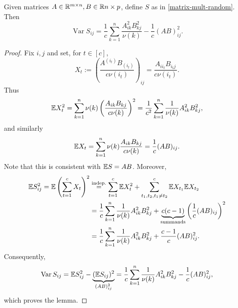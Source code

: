 \begin{lemma} \label{lemma:var-appro-prod}
Given matrices $A\in \mathbb{R}^{m \times n}, B\in \mathbb{R}{n\times p}$, define $S$ as in \eqref{matrix-mult-random}. Then
\begin{equation}
\operatorname{Var} S_{ij} = \frac{1}{c} \sum_{k=1}^n \frac{A_{ik}^2 B_{kj}^2}{\nu(k)} - \frac{1}{c} (AB)_{ij}^2.
\end{equation}
\begin{proof}
Fix $i,j$ and set, for $t\in [c]$,
\begin{equation*}
X_t := \left(
\frac{A^{(i_t)}B_{(i_t)}}{c\nu(i_t)}
\right)_{ij} = \frac{A_{i i_t}B_{i_t j}}{c\nu(i_t)}.
\end{equation*}
Thus
\begin{equation*}
\mathbb{E} X_t^2 = \sum_{k=1}^n \nu(k) \left(
\frac{A_{ik}B_{kj}}{c\nu(k)}
\right)^2 = \frac{1}{c^2}\sum_{k=1}^n \frac{1}{\nu(k)}A^2_{ik}B^2_{kj},
\end{equation*}
and similarly
\begin{equation*}
\mathbb{E} X_t = \sum_{k=1}^n \nu(k) \frac{A_{ik}B_{kj}}{c \nu(k)}= \frac{1}{c} (AB)_{ij}.
\end{equation*}
Note that this is consistent with $\mathbb{E} S= AB$. Moreover,
\begin{equation*}
\begin{split}
\mathbb{E} S_{ij}^2 = \mathbb{E} \left( \sum_{t=1}^c X_t \right)^2 & \overset{\text{indep.}}{=} \sum_{t=1}^c \mathbb{E} X_t^2 + \sum_{t_1,t_2, t_1 \neq t_2}^c \mathbb{E} X_{t_1} \mathbb{E} X_{t_2} \\
& = \frac{1}{c}\sum_{k=1}^n \frac{1}{\nu(k)} A_{ik}^2 B_{kj}^2 + \underbrace{c(c-1)}_{\text{summands}} \left(\frac{1}{c}(AB)_{ij}\right)^2 \\
& =  \frac{1}{c}\sum_{k=1}^n \frac{1}{\nu(k)} A_{ik}^2 B_{kj}^2 + \frac{c-1}{c} (AB)_{ij}^2.
\end{split}
\end{equation*}
Consequently,
\begin{equation*}
\operatorname{Var}S_{ij} = \mathbb{E} S_{ij}^2 - \underbrace{(\mathbb{E} S_{ij})^2}_{(AB)_{ij}^2} =  \frac{1}{c}\sum_{k=1}^n \frac{1}{\nu(k)} A_{ik}^2 B_{kj}^2 - \frac{1}{c} (AB)_{ij}^2,
\end{equation*}
which proves the lemma.
\end{proof}
\end{lemma}
